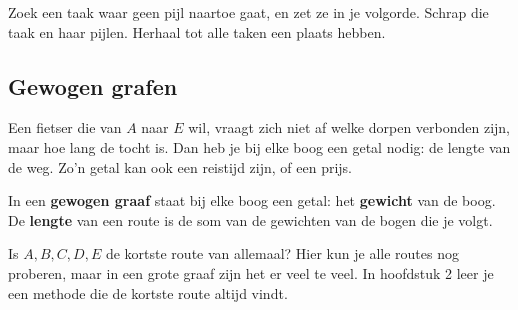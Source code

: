 \begin{werkwijze}
Zoek een taak waar geen pijl naartoe gaat, en zet ze in je volgorde. Schrap die taak en haar pijlen. Herhaal tot alle taken een plaats hebben.
\end{werkwijze}

\begin{oefeningen}
\end{oefeningen}

\subsection{Gewogen grafen}

Een fietser die van $A$ naar $E$ wil, vraagt zich niet af welke dorpen verbonden zijn, maar hoe lang de tocht is. Dan heb je bij elke boog een getal nodig: de lengte van de weg. Zo'n getal kan ook een reistijd zijn, of een prijs.

\begin{theorie}
In een \textbf{\textcolor{accent}{gewogen graaf}} staat bij elke boog een getal: het \textbf{\textcolor{accent}{gewicht}} van de boog. De \textbf{\textcolor{accent}{lengte}} van een route is de som van de gewichten van de bogen die je volgt.
\end{theorie}


Is $A, B, C, D, E$ de kortste route van allemaal? Hier kun je alle routes nog proberen, maar in een grote graaf zijn het er veel te veel. In hoofdstuk 2 leer je een methode die de kortste route altijd vindt.

